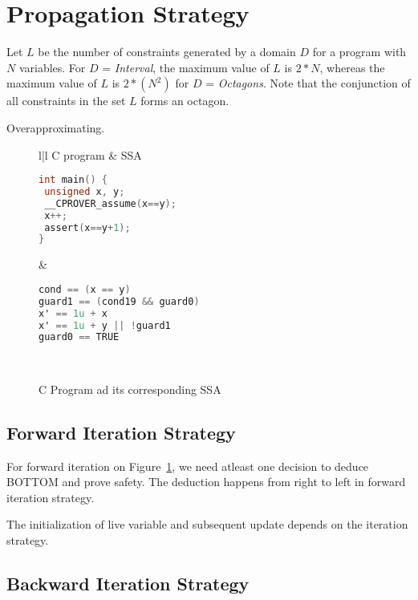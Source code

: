\section{Propagation Strategy}\label{deduction}
Let $L$ be the number of constraints generated by a domain $D$
for a program with $N$ variables. For $D$ = {\em Interval}, the 
maximum value of $L$ is $2*N$, whereas the maximum value of $L$ is 
$2*(N^2)$ for $D$ = {\em Octagons}. Note that the conjunction of all 
constraints in the set $L$ forms an octagon.

Overapproximating.


\begin{figure}[t]
\scriptsize
\begin{tabular}{l|l}
\hline
C program & SSA \\
\hline
\begin{lstlisting}[mathescape=true,language=C]
int main() {
 unsigned x, y;
 __CPROVER_assume(x==y);
 x++;
 assert(x==y+1);
}
\end{lstlisting}
&
\begin{lstlisting}[mathescape=true,language=C]
cond == (x == y)
guard1 == (cond19 && guard0)
x' == 1u + x
x' == 1u + y || !guard1
guard0 == TRUE
\end{lstlisting}
\\
\hline
\end{tabular}
\caption{C Program ad its corresponding SSA}
\label{sw-ssa}
\end{figure}

\subsection{Forward Iteration Strategy}
For forward iteration on Figure~\ref{sw-ssa}, we need atleast 
one decision to deduce BOTTOM and prove safety. The deduction 
happens from right to left in forward iteration strategy.

The initialization of live variable and subsequent update depends on the iteration strategy.

\subsection{Backward Iteration Strategy}

